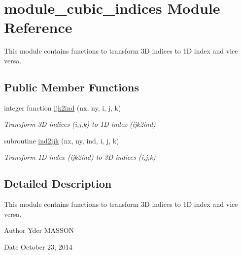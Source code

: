 \hypertarget{classmodule__cubic__indices}{
\section{module\-\_\-cubic\-\_\-indices \-Module \-Reference}
\label{classmodule__cubic__indices}
}


\-This module contains functions to transform 3\-D indices to 1\-D index and vice versa.  


\subsection*{\-Public \-Member \-Functions}
\begin{DoxyCompactItemize}
\item 
integer function \hyperlink{classmodule__cubic__indices_ae8cab7f4dee55370ad9af071bdc7e281}{ijk2ind} (nx, ny, i, j, k)
\begin{DoxyCompactList}\small\item\em \-Transform 3\-D indices (i,j,k) to 1\-D index (ijk2ind) \end{DoxyCompactList}\item 
subroutine \hyperlink{classmodule__cubic__indices_aa2f083a1f3a62525283b9d9f6b0f3cd2}{ind2ijk} (nx, ny, ind, i, j, k)
\begin{DoxyCompactList}\small\item\em \-Transform 1\-D index (ijk2ind) to 3\-D indices (i,j,k) \end{DoxyCompactList}\end{DoxyCompactItemize}


\subsection{\-Detailed \-Description}
\-This module contains functions to transform 3\-D indices to 1\-D index and vice versa. 

\begin{DoxyAuthor}{\-Author}
\-Yder \-M\-A\-S\-S\-O\-N 
\end{DoxyAuthor}
\begin{DoxyDate}{\-Date}
\-October 23, 2014 
\end{DoxyDate}


